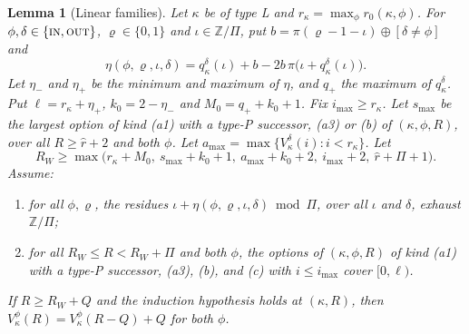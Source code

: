 \documentclass[11pt]{amsart}
\newtheorem{lemma}[theorem]{Lemma}
\theoremstyle{definition}
\theoremstyle{remark}
\newcommand{\IN}{\textup{\textsc{in}}}
\newcommand{\OUT}{\textup{\textsc{out}}}
\begin{document}
\begin{lemma}[Linear families]\label{lem:propL}
Let $\kappa$ be of type L and $r_\kappa=\max_\phi r_0(\kappa,\phi)$. For $\phi,\delta\in\{\IN,\OUT\}$, $\varrho\in\{0,1\}$ and $\iota\in\mathbb Z/\Pi$, put $b=\pi(\varrho-1-\iota)\oplus[\delta\ne\phi]$ and
\[
  \eta(\phi,\varrho,\iota,\delta)=q^\delta_\kappa(\iota)+b-2b\,\pi\bigl(\iota+q^\delta_\kappa(\iota)\bigr).
\]
Let $\eta_-$ and $\eta_+$ be the minimum and maximum of $\eta$, and $q_+$ the maximum of $q^\delta_\kappa$. Put $\ell=r_\kappa+\eta_+$, $k_0=2-\eta_-$ and $M_0=q_++k_0+1$. Fix $i_{\max}\ge r_\kappa$. Let $s_{\max}$ be the largest option of kind (a1) with a type-P successor, (a3) or (b) of $(\kappa,\phi,R)$, over all $R\ge\hat r+2$ and both $\phi$. Let $a_{\max}=\max\{V^\delta_\kappa(i):i<r_\kappa\}$. Let
\[
  R_W\ge\max\bigl(r_\kappa+M_0,\ s_{\max}+k_0+1,\ a_{\max}+k_0+2,\ i_{\max}+2,\ \hat r+\Pi+1\bigr).
\]
Assume:
\begin{enumerate}[label=\textup{(W\arabic*)},leftmargin=*]
\item for all $\phi,\varrho$, the residues $\iota+\eta(\phi,\varrho,\iota,\delta)\bmod\Pi$, over all $\iota$ and $\delta$, exhaust $\mathbb Z/\Pi$;
\item for all $R_W\le R<R_W+\Pi$ and both $\phi$, the options of $(\kappa,\phi,R)$ of kind (a1) with a type-P successor, (a3), (b), and (c) with $i\le i_{\max}$ cover $[0,\ell)$.
\end{enumerate}
If $R\ge R_W+Q$ and the induction hypothesis holds at $(\kappa,R)$, then $V^\phi_\kappa(R)=V^\phi_\kappa(R-Q)+Q$ for both $\phi$.
\end{lemma}
\end{document}
